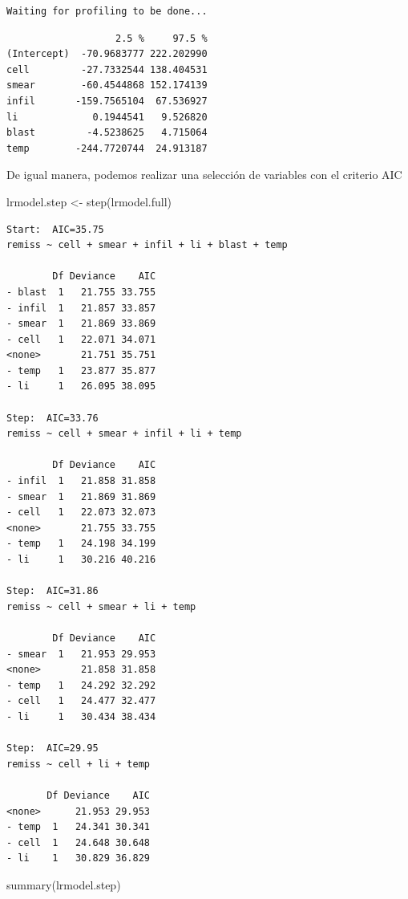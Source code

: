 \documentclass[
  letterpaper,
  DIV=11,
  numbers=noendperiod]{scrartcl}
\newenvironment{Shaded}{\begin{snugshade}}{\end{snugshade}}
\newcommand{\FunctionTok}[1]{\textcolor[rgb]{0.28,0.35,0.67}{#1}}
\newcommand{\NormalTok}[1]{\textcolor[rgb]{0.00,0.23,0.31}{#1}}
\newcommand{\OtherTok}[1]{\textcolor[rgb]{0.00,0.23,0.31}{#1}}
\begin{document}
\begin{verbatim}
Waiting for profiling to be done...
\end{verbatim}

\begin{verbatim}
                   2.5 %     97.5 %
(Intercept)  -70.9683777 222.202990
cell         -27.7332544 138.404531
smear        -60.4544868 152.174139
infil       -159.7565104  67.536927
li             0.1944541   9.526820
blast         -4.5238625   4.715064
temp        -244.7720744  24.913187
\end{verbatim}

De igual manera, podemos realizar una selección de variables con el
criterio AIC

\begin{Shaded}
\begin{Highlighting}[]
\NormalTok{lrmodel.step }\OtherTok{\textless{}{-}} \FunctionTok{step}\NormalTok{(lrmodel.full)}
\end{Highlighting}
\end{Shaded}

\begin{verbatim}
Start:  AIC=35.75
remiss ~ cell + smear + infil + li + blast + temp

        Df Deviance    AIC
- blast  1   21.755 33.755
- infil  1   21.857 33.857
- smear  1   21.869 33.869
- cell   1   22.071 34.071
<none>       21.751 35.751
- temp   1   23.877 35.877
- li     1   26.095 38.095

Step:  AIC=33.76
remiss ~ cell + smear + infil + li + temp

        Df Deviance    AIC
- infil  1   21.858 31.858
- smear  1   21.869 31.869
- cell   1   22.073 32.073
<none>       21.755 33.755
- temp   1   24.198 34.199
- li     1   30.216 40.216

Step:  AIC=31.86
remiss ~ cell + smear + li + temp

        Df Deviance    AIC
- smear  1   21.953 29.953
<none>       21.858 31.858
- temp   1   24.292 32.292
- cell   1   24.477 32.477
- li     1   30.434 38.434

Step:  AIC=29.95
remiss ~ cell + li + temp

       Df Deviance    AIC
<none>      21.953 29.953
- temp  1   24.341 30.341
- cell  1   24.648 30.648
- li    1   30.829 36.829
\end{verbatim}

\begin{Shaded}
\begin{Highlighting}[]
\FunctionTok{summary}\NormalTok{(lrmodel.step)}
\end{Highlighting}
\end{Shaded}
\end{document}
